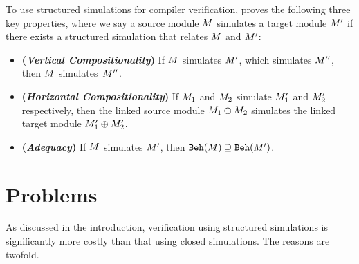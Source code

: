 To use structured simulations for compiler verification, \ccc{} proves
the following three key properties, where we say a source module
$M$ simulates a target module $M'$ if there exists a
structured simulation that relates $M$ and $M'$:
\begin{itemize}
\item \textbf{(\emph{Vertical Compositionality})}
  If $M$ simulates $M'$, which simulates $M''$,
  then $M$ simulates~$M''$.
\item \textbf{(\emph{Horizontal Compositionality})}
  If $M_1$ and $M_2$ simulate
     $M'_1$ and $M'_2$ respectively,
  then the linked source module  $M_1 \oplus M_2$ simulates
  the linked target module $M'_1 \oplus M'_2$.
\item \textbf{(\emph{Adequacy})}
  If $M$ simulates $M'$,
  then $\mathtt{Beh}({M}) \supseteq \mathtt{Beh}({M'})$.
\end{itemize}

\section{Problems}
\label{sec:overview-verification:problems}
%
%
%

As discussed in the introduction, verification using structured
simulations is significantly more costly than that using closed
simulations.  The reasons are twofold.

